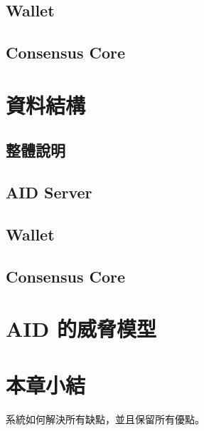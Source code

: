 \subsection{Wallet}
\subsection{Consensus Core}
\section{資料結構}
\subsection{整體說明}
\subsection{AID Server}
\subsection{Wallet}
\subsection{Consensus Core}
\section{AID 的威脅模型}
\section{本章小結}
系統如何解決所有缺點，並且保留所有優點。
